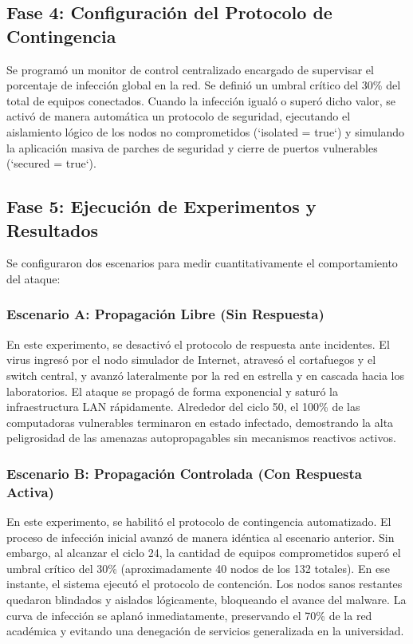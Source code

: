 \subsection{Fase 4: Configuración del Protocolo de Contingencia}
Se programó un monitor de control centralizado encargado de supervisar el porcentaje de infección global en la red. Se definió un umbral crítico del 30\% del total de equipos conectados. Cuando la infección igualó o superó dicho valor, se activó de manera automática un protocolo de seguridad, ejecutando el aislamiento lógico de los nodos no comprometidos (`isolated = true`) y simulando la aplicación masiva de parches de seguridad y cierre de puertos vulnerables (`secured = true`).

\subsection{Fase 5: Ejecución de Experimentos y Resultados}
Se configuraron dos escenarios para medir cuantitativamente el comportamiento del ataque:

\subsubsection{Escenario A: Propagación Libre (Sin Respuesta)}
En este experimento, se desactivó el protocolo de respuesta ante incidentes. El virus ingresó por el nodo simulador de Internet, atravesó el cortafuegos y el switch central, y avanzó lateralmente por la red en estrella y en cascada hacia los laboratorios. El ataque se propagó de forma exponencial y saturó la infraestructura LAN rápidamente. Alrededor del ciclo 50, el 100\% de las computadoras vulnerables terminaron en estado infectado, demostrando la alta peligrosidad de las amenazas autopropagables sin mecanismos reactivos activos.

\subsubsection{Escenario B: Propagación Controlada (Con Respuesta Activa)}
En este experimento, se habilitó el protocolo de contingencia automatizado. El proceso de infección inicial avanzó de manera idéntica al escenario anterior. Sin embargo, al alcanzar el ciclo 24, la cantidad de equipos comprometidos superó el umbral crítico del 30\% (aproximadamente 40 nodos de los 132 totales). En ese instante, el sistema ejecutó el protocolo de contención. Los nodos sanos restantes quedaron blindados y aislados lógicamente, bloqueando el avance del malware. La curva de infección se aplanó inmediatamente, preservando el 70\% de la red académica y evitando una denegación de servicios generalizada en la universidad.
